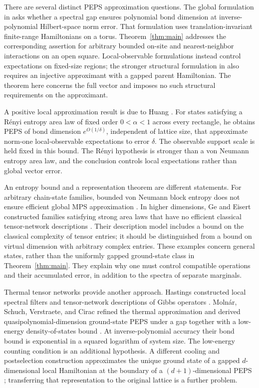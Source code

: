\documentclass[11pt]{article}
\numberwithin{equation}{section}
\theoremstyle{definition}
\theoremstyle{remark}
\begin{document}
There are several distinct PEPS approximation questions. The global
formulation in \cite[Section~2.2, Questions~7--8]{CiracGarreRubioPerezGarcia2019}
asks whether a spectral gap ensures polynomial bond dimension at
inverse-polynomial Hilbert-space norm error. That formulation uses
translation-invariant finite-range Hamiltonians on a torus.
Theorem~\ref{thm:main} addresses the corresponding assertion for arbitrary
bounded on-site and nearest-neighbor interactions on an open square.
Local-observable formulations instead control expectations on fixed-size
regions; the stronger structural formulation in
\cite[Conjecture~2]{SchwarzBuerschaperEisert2017} also requires an injective
approximant with a gapped parent Hamiltonian. The theorem here concerns the
full vector and imposes no such structural requirements on the approximant.

A positive local approximation result is due to Huang
\cite[Theorem~3]{Huang2026Local}. For states satisfying a R\'enyi entropy
area law of fixed order $0<\alpha<1$ across every rectangle, he obtains
PEPS of bond dimension $e^{O(1/\delta)}$, independent of lattice size,
that approximate norm-one local-observable expectations to error $\delta$.
The observable support scale is held fixed in this bound. The R\'enyi
hypothesis is stronger than a von Neumann entropy area law, and the
conclusion controls local expectations rather than global vector error.

An entropy bound and a representation theorem are different statements.
For arbitrary chain-state families, bounded von Neumann block entropy
does not ensure efficient global MPS approximation
\cite{SchuchWolfVerstraeteCirac2008}. In higher dimensions, Ge and Eisert
constructed families satisfying strong area laws that have no efficient
classical tensor-network descriptions
\cite[Definition~7 and Corollary~9]{GeEisert2016}. Their description model
includes a bound on the classical complexity of tensor entries; it should
be distinguished from a bound on virtual dimension with arbitrary complex
entries. These examples concern general states, rather than the uniformly
gapped ground-state class in Theorem~\ref{thm:main}. They explain why one
must control compatible operations and their accumulated error, in addition
to the spectra of separate marginals.

Thermal tensor networks provide another approach. Hastings constructed
local spectral filters and tensor-network descriptions of Gibbs operators
\cite{Hastings2006Local}. Moln\'ar, Schuch, Verstraete, and Cirac refined the
thermal approximation and derived quasipolynomial-dimension ground-state
PEPS under a gap together with a low-energy density-of-states bound
\cite[Section~III.C]{MolnarSchuchVerstraeteCirac2015}. At inverse-polynomial
accuracy their bond bound is exponential in a squared logarithm of system
size. The low-energy counting condition is an additional hypothesis.
A different cooling and postselection construction approximates the unique
ground state of a gapped $d$-dimensional local Hamiltonian at the boundary
of a $(d+1)$-dimensional PEPS
\cite[Section~V]{SchuchWolfVerstraeteCirac2007Complexity}; transferring that
representation to the original lattice is a further problem.
\end{document}

